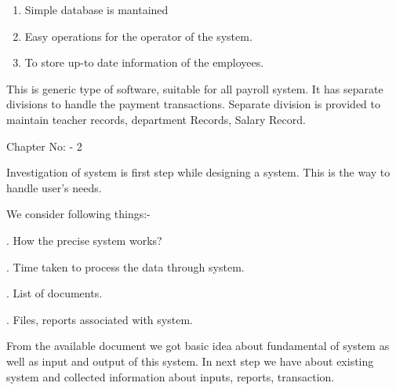 \documentclass{article} %
\begin{document}
\begin{enumerate}
\item  Simple database is mantained

\item  Easy operations for the operator of the system. 

\item  To store up-to date information of the employees. 
\end{enumerate}

\noindent 

\noindent \textbf{}\underbar{}

\noindent 

\noindent This is generic type of software, suitable for all payroll system. It has separate divisions to handle the payment transactions. Separate division is provided to maintain teacher records, department  Records, Salary Record.

\noindent 

\noindent 

\noindent 

\noindent 

\noindent 

\noindent                                                        

\noindent                                                   Chapter No: - 2 

\noindent \textbf{                     }

\noindent 

\noindent \textbf{}

\noindent 

\noindent Investigation of system is first step while designing a system. This is the way to handle user's needs. 

\noindent We consider following things:- 

. How the precise system works? 

. Time taken to process the data through system. 

. List of documents. 

. Files, reports associated with system. 

\noindent 

\noindent From the available document we got basic idea about fundamental of system as well as input and output of this system. In next step we have about existing system and collected information about inputs, reports, transaction. 
\end{document}
